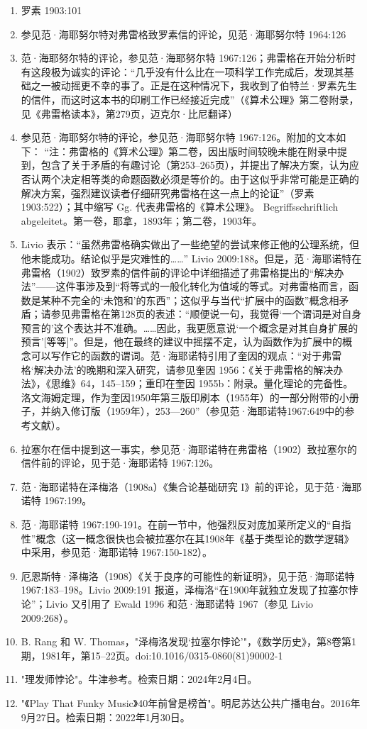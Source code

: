 \begin{enumerate}
\item 罗素 1903:101  
\item 参见范·海耶努尔特对弗雷格致罗素信的评论，见范·海耶努尔特 1964:126  
\item 范·海耶努尔特的评论，参见范·海耶努尔特 1967:126；弗雷格在开始分析时有这段极为诚实的评论：“几乎没有什么比在一项科学工作完成后，发现其基础之一被动摇更不幸的事了。正是在这种情况下，我收到了伯特兰·罗素先生的信件，而这时这本书的印刷工作已经接近完成”（《算术公理》第二卷附录，见《弗雷格读本》，第279页，迈克尔·比尼翻译）
\item 参见范·海耶努尔特的评论，参见范·海耶努尔特 1967:126。附加的文本如下：
“注：弗雷格的《算术公理》第二卷，因出版时间较晚未能在附录中提到，包含了关于矛盾的有趣讨论（第253–265页），并提出了解决方案，认为应否认两个决定相等类的命题函数必须是等价的。由于这似乎非常可能是正确的解决方案，强烈建议读者仔细研究弗雷格在这一点上的论证”（罗素 1903:522）；其中缩写 Gg. 代表弗雷格的《算术公理》。 Begriffsschriftlich abgeleitet。第一卷，耶拿，1893年；第二卷，1903年。
\item Livio 表示：“虽然弗雷格确实做出了一些绝望的尝试来修正他的公理系统，但他未能成功。结论似乎是灾难性的……” Livio 2009:188。但是，范·海耶诺特在弗雷格（1902）致罗素的信件前的评论中详细描述了弗雷格提出的“解决办法”——这件事涉及到“将等式的一般化转化为值域的等式。对弗雷格而言，函数是某种不完全的‘未饱和’的东西”；这似乎与当代“扩展中的函数”概念相矛盾；请参见弗雷格在第128页的表述：“顺便说一句，我觉得‘一个谓词是对自身预言的’这个表达并不准确。……因此，我更愿意说‘一个概念是对其自身扩展的预言’[等等]”。但是，他在最终的建议中摇摆不定，认为函数作为扩展中的概念可以写作它的函数的谓词。范·海耶诺特引用了奎因的观点：“对于弗雷格‘解决办法’的晚期和深入研究，请参见奎因 1956：《关于弗雷格的解决办法》，《思维》64，145–159；重印在奎因 1955b：附录。量化理论的完备性。洛文海姆定理，作为奎因1950年第三版印刷本（1955年）的一部分附带的小册子，并纳入修订版（1959年），253—260”（参见范·海耶诺特1967:649中的参考文献）。
\item 拉塞尔在信中提到这一事实，参见范·海耶诺特在弗雷格（1902）致拉塞尔的信件前的评论，见于范·海耶诺特 1967:126。  
\item 范·海耶诺特在泽梅洛（1908a）《集合论基础研究 I》前的评论，见于范·海耶诺特 1967:199。  
\item 范·海耶诺特 1967:190-191。在前一节中，他强烈反对庞加莱所定义的“自指性”概念（这一概念很快也会被拉塞尔在其1908年《基于类型论的数学逻辑》中采用，参见范·海耶诺特 1967:150-182）。
\item 厄恩斯特·泽梅洛（1908）《关于良序的可能性的新证明》，见于范·海耶诺特 1967:183–198。Livio 2009:191 报道，泽梅洛“在1900年就独立发现了拉塞尔悖论”；Livio 又引用了 Ewald 1996 和范·海耶诺特 1967（参见 Livio 2009:268）。  
\item B. Rang 和 W. Thomas，"泽梅洛发现‘拉塞尔悖论’"，《数学历史》，第8卷第1期，1981年，第15–22页。doi:10.1016/0315-0860(81)90002-1  
\item "理发师悖论"。牛津参考。检索日期：2024年2月4日。  
\item "《Play That Funky Music》40年前曾是榜首"。明尼苏达公共广播电台。2016年9月27日。检索日期：2022年1月30日。
\end{enumerate}